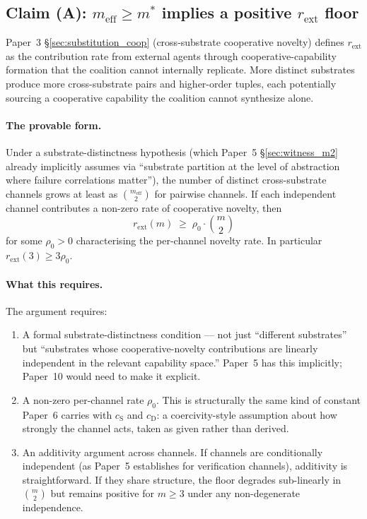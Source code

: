\documentclass{article}
\newcommand{\rext}{r_{\mathrm{ext}}}
\newcommand{\meff}{m_{\mathrm{eff}}}
\begin{document}
\subsection{Claim (A): $\meff \geq m^*$ implies a positive $\rext$ floor}

Paper~3 \S\ref{sec:substitution_coop} (cross-substrate cooperative
novelty) defines $\rext$ as the contribution rate from external agents
through cooperative-capability formation that the coalition cannot
internally replicate.  More distinct substrates produce more
cross-substrate pairs and higher-order tuples, each potentially
sourcing a cooperative capability the coalition cannot synthesize alone.

\paragraph{The provable form.}
Under a substrate-distinctness hypothesis (which Paper~5 \S\ref{sec:witness_m2}
already implicitly assumes via ``substrate partition at the level of
abstraction where failure correlations matter''), the number of
distinct cross-substrate channels grows at least as $\binom{\meff}{2}$
for pairwise channels.  If each independent channel contributes a
non-zero rate of cooperative novelty, then
\[
  \rext(m) \;\geq\; \rho_0 \cdot \binom{m}{2}
\]
for some $\rho_0 > 0$ characterising the per-channel novelty rate.  In
particular $\rext(3) \geq 3\rho_0$.

\paragraph{What this requires.}
The argument requires:
\begin{enumerate}
\item A formal substrate-distinctness condition --- not just
  ``different substrates'' but ``substrates whose cooperative-novelty
  contributions are linearly independent in the relevant capability
  space.''  Paper~5 has this implicitly; Paper~10 would need to make it
  explicit.
\item A non-zero per-channel rate $\rho_0$.  This is structurally the
  same kind of constant Paper~6 carries with $c_{\mathrm{S}}$ and
  $c_{\mathrm{D}}$: a coercivity-style assumption about how strongly the
  channel acts, taken as given rather than derived.
\item An additivity argument across channels.  If channels are
  conditionally independent (as Paper~5 establishes for verification
  channels), additivity is straightforward.  If they share structure,
  the floor degrades sub-linearly in $\binom{m}{2}$ but remains
  positive for $m \geq 3$ under any non-degenerate independence.
\end{enumerate}
\end{document}
